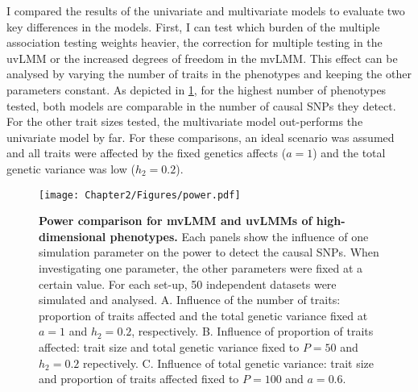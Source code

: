 I compared the results of the univariate and multivariate models to evaluate  two key differences in the models. First, I can test which burden of the multiple association testing weights heavier, the correction for multiple testing in the uvLMM or the increased degrees of freedom in the mvLMM. This effect can be analysed by varying the number of traits in the phenotypes and keeping the other parameters constant. As depicted in \cref{fig:power}, for the highest number of phenotypes tested, both models are comparable in the number of causal SNPs they detect. For the other trait sizes tested, the multivariate model out-performs the univariate model by far. For these comparisons, an ideal scenario was assumed and all traits were affected by the fixed genetics affects (\(a=1\)) and the total genetic variance was low (\(h_2=0.2\)). 
%
\begin{figure}[hbtp]
	\centering
	\texttt{[image: Chapter2/Figures/power.pdf]}
	\caption[\textbf{Power comparison for mvLMM and uvLMMs of high-dimensional phenotypes.}]{\textbf{Power comparison for mvLMM and uvLMMs of high-dimensional phenotypes.} Each panels show the influence of one simulation parameter on the power to detect the causal SNPs. When investigating one parameter, the other parameters were fixed at a certain value. For each set-up, 50 independent datasets were simulated and analysed. A. Influence of the number of traits: proportion of traits affected and the total genetic variance fixed at \(a=1\) and \(h_2=0.2\), respectively. B. Influence of proportion of traits affected: trait size and total genetic variance fixed to \(P=50\) and \(h_2=0.2\) repectively. C. Influence of total genetic variance:  trait size and  proportion of traits affected fixed to \(P=100\) and \(a=0.6\).} 
 	\label{fig:power}
\end{figure}

